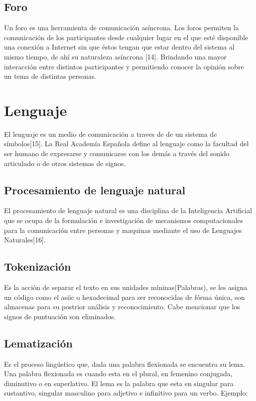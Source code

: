 \subsection{Foro}
Un foro es una herramienta de comunicación asíncrona. Los  foros permiten la comunicación de los participantes desde cualquier lugar en el que  esté  disponible  una  conexión  a Internet  sin  que  éstos  tengan  que  estar dentro del sistema al mismo tiempo, de ahí su naturaleza asíncrona [14]. Brindando una mayor interacción entre distintos participantes y permitiendo conocer la opinión sobre un tema de distintas personas.


\section{Lenguaje}
El lenguaje es un medio de comunicación a traves de de un sistema de símbolos[15].
La Real Academía Española define al lenguaje como la facultad del ser humano de expresarse y comunicarse con los demás a través del sonido articulado o de otros sistemas de signos.

\subsection{Procesamiento de lenguaje natural}
El procesamiento de lenguaje natural es una disciplina de la Inteligencia Artificial que se ocupa de la formulación e investigación de mecanismos computacionales para la comunicación entre personas y maquinas mediante el uso de Lenguajes Naturales[16].

\subsection{Tokenización}


Es la acción de separar el texto en sus unidades míninas(Palabras), se les
asigna un código como el asiic o hexadecimal para ser reconocidas de fórma
única, son almacenas para su postrior análisis y reconocimiento. Cabe mencionar que los
signos de puntuación son eliminados.

\subsection{Lematización}

Es el proceso lingüstico que, dada una palabra flexionada se encuentra su
lema. Una palabra flexionada es cuando esta en el plural, en femenino conjugada,
diminutivo o en superlativo. El lema es la palabra que esta en singular para
sustantivo, singular masculino para adjetivo e infinitivo para un verbo. Ejemplo:

